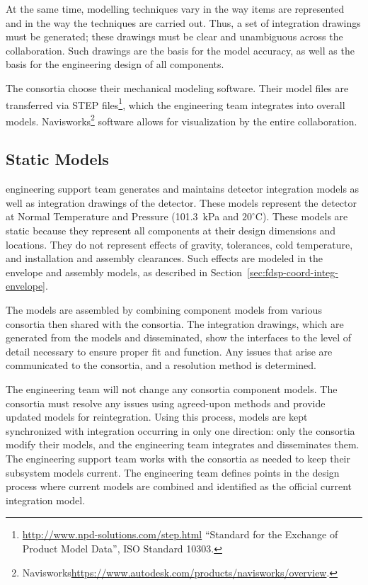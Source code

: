 At the same time, \threed modelling techniques vary in the way items are
represented and in the way the techniques are carried out. Thus, a set
of \twod integration drawings must be generated; these drawings must be
clear and unambiguous across the collaboration. Such \twod drawings are
the basis for the \threed model accuracy, as well as the basis for the engineering
design of all components.

The consortia choose their mechanical modeling software.
Their model files are transferred via STEP files\footnote{\url{http://www.npd-solutions.com/step.html} ``Standard for the Exchange of Product Model Data'', ISO Standard 10303.}, which the  engineering team integrates into overall models.  Navisworks\footnote{Navisworks\texttrademark \url{https://www.autodesk.com/products/navisworks/overview}.} software allows for visualization by
the entire collaboration.

\subsection{Static Models}
\label{sec:fdsp-coord-integ-static}

 engineering support team generates and maintains \threed detector
integration models as well as  \twod integration drawings of the detector.
These models represent the detector at Normal Temperature and Pressure
(\SI{101.3}{kPa} and $20^\circ$C). These models are static because they represent all
components at their design dimensions and locations. They do not represent
effects of gravity, tolerances, cold temperature, and installation and
assembly clearances. Such effects are modeled in the envelope and assembly
models, as described in Section~\ref{sec:fdsp-coord-integ-envelope}.


The \threed models are assembled by combining component models from
various consortia  then shared with the consortia. The \twod
integration drawings, which are generated from the \threed models and
disseminated, show the interfaces to the level of detail necessary to
ensure proper fit and function. Any issues that arise are communicated
to the consortia, and a resolution method is determined.

The  engineering team will not change any
consortia component models.  The consortia must resolve any issues
using agreed-upon methods  and provide updated models for
reintegration. Using this process, models are kept synchronized with
integration occurring in only one direction: only the consortia modify
their models, and the  engineering team
integrates and disseminates them.  The  engineering support team works with the consortia as needed to keep their subsystem models current. 
The   engineering team defines points in the design 
process where current models are combined and identified as the official
current integration model.

